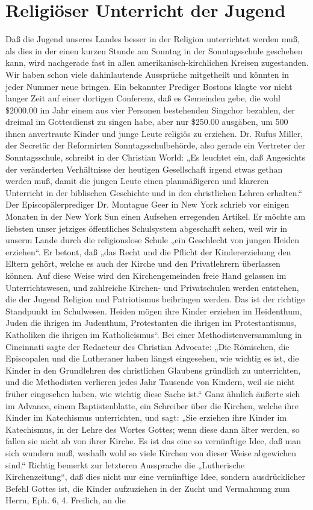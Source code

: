 \chapter[Religiöser Unterricht]{Religiöser Unterricht der Jugend}
Daß die Jugend unseres Landes besser in der Religion unterrichtet werden muß, als dies in der einen kurzen Stunde am Sonntag in der Sonntagsschule geschehen kann, wird nachgerade fast in allen amerikanisch-kirchlichen Kreisen zugestanden. Wir haben schon viele dahinlautende Aussprüche mitgetheilt und könnten in jeder Nummer neue bringen. Ein bekannter Prediger Bostons klagte vor nicht langer Zeit auf einer dortigen Conferenz, daß es Gemeinden gebe, die wohl \$2000.00 im Jahr einem aus vier Personen bestehenden Singchor bezahlen, der dreimal im Gottesdienst zu singen habe, aber nur \$250.00 ausgäben, um 500 ihnen anvertraute Kinder und junge Leute religiös zu erziehen. Dr. Rufus Miller, der Secretär der Reformirten Sonntagsschulbehörde, also gerade ein Vertreter der Sonntagsschule, schreibt in der Christian World: „Es leuchtet ein, daß Angesichts der veränderten Verhältnisse der heutigen Gesellschaft irgend etwas gethan werden muß, damit die jungen Leute einen planmäßigeren und klareren Unterricht in der biblischen Geschichte und in den christlichen Lehren erhalten.“ Der Episcopälerprediger Dr. Montague Geer in New York schrieb vor einigen Monaten in der New York Sun einen Aufsehen erregenden Artikel. Er möchte am liebsten unser jetziges öffentliches Schulsystem abgeschafft sehen, weil wir in unserm Lande durch die religionslose Schule „ein Geschlecht von jungen Heiden erziehen“. Er betont, daß „das Recht und die Pflicht der Kindererziehung den Eltern gehört, welche es auch der Kirche und den Privatlehrern überlassen können. Auf diese Weise wird den Kirchengemeinden freie Hand gelassen im Unterrichtswesen, und zahlreiche Kirchen- und Privatschulen werden entstehen, die der Jugend Religion und Patriotismus beibringen werden. Das ist der richtige Standpunkt im Schulwesen. Heiden mögen ihre Kinder erziehen im Heidenthum, Juden die ihrigen im Judenthum, Protestanten die ihrigen im Protestantismus, Katholiken die ihrigen im Katholicismus“. Bei einer Methodistenversammlung in Cincinnati sagte der Redacteur des Christian Advocate: „Die Römischen, die Episcopalen und die Lutheraner haben längst eingesehen, wie wichtig es ist, die Kinder in den Grundlehren des christlichen Glaubens gründlich zu unterrichten, und die Methodisten verlieren jedes Jahr Tausende von Kindern, weil sie nicht früher eingesehen haben, wie wichtig diese Sache ist.“ Ganz ähnlich äußerte sich im Advance, einem Baptistenblatte, ein Schreiber über die Kirchen, welche ihre Kinder im Katechismus unterrichten, und sagt: „Sie erziehen ihre Kinder im Katechismus, in der Lehre des Wortes Gottes; wenn diese dann älter werden, so fallen sie nicht ab von ihrer Kirche. Es ist das eine so vernünftige Idee, daß man sich wundern muß, weshalb wohl so viele Kirchen von dieser Weise abgewichen sind.“ Richtig bemerkt zur letzteren Aussprache die „Lutherische Kirchenzeitung“, daß dies nicht nur eine vernünftige Idee, sondern ausdrücklicher Befehl Gottes ist, die Kinder aufzuziehen in der Zucht und Vermahnung zum Herrn, Eph. 6, 4. Freilich, an die 